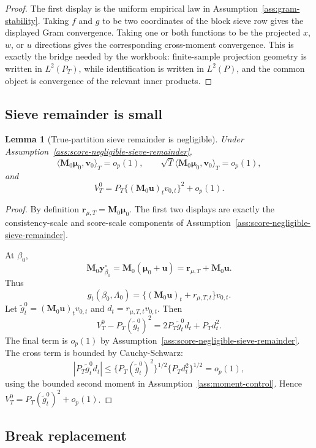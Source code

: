 \documentclass[12pt]{article}
\numberwithin{equation}{section}
\newtheorem{lemma}{Lemma}
\theoremstyle{definition}
\newcommand{\op}{o_p}
\newcommand{\innerT}[2]{\langle #1,#2\rangle_T}
\begin{document}
\begin{proof}
The first display is the uniform empirical law in
Assumption~\ref{ass:gram-stability}. Taking \(f\) and \(g\) to be two
coordinates of the block sieve row gives the displayed Gram convergence.
Taking one or both functions to be the projected \(x\), \(w\), or \(u\)
directions gives the corresponding cross-moment convergence. This is exactly
the bridge needed by the workbook: finite-sample projection geometry is written
in \(L^2(P_T)\), while identification is written in \(L^2(P)\), and the common
object is convergence of the relevant inner products.
\end{proof}
\subsection{Sieve remainder is small}

\begin{lemma}[True-partition sieve remainder is negligible]
\label{lem:part2-sieve-remainder}
Under Assumption~\ref{ass:score-negligible-sieve-remainder},
\[
    \innerT{\bm M_0\bm\mu_0}{\bm v_0}=\op(1),
    \qquad
    \sqrt T\innerT{\bm M_0\bm\mu_0}{\bm v_0}=\op(1),
\]
and
\[
    V_T^0
    =P_T\{(\bm M_0\bm u)_tv_{0,t}\}^2+\op(1).
\]
\end{lemma}

\begin{proof}
By definition \(\bm r_{\mu,T}=\bm M_0\bm\mu_0\). The first two displays are
exactly the consistency-scale and score-scale components of
Assumption~\ref{ass:score-negligible-sieve-remainder}.

At \(\beta_0\),
\[
    \bm M_0\bm y_{\beta_0}^\circ
    =\bm M_0(\bm\mu_0+\bm u)
    =\bm r_{\mu,T}+\bm M_0\bm u.
\]
Thus
\[
    g_t(\beta_0,\Lambda_0)
    =\{(\bm M_0\bm u)_t+r_{\mu,T,t}\}v_{0,t}.
\]
Let \(\tilde g_t^0=(\bm M_0\bm u)_tv_{0,t}\) and
\(d_t=r_{\mu,T,t}v_{0,t}\). Then
\[
    V_T^0-P_T(\tilde g_t^0)^2
    =2P_T\tilde g_t^0d_t+P_Td_t^2.
\]
The final term is \(\op(1)\) by Assumption~\ref{ass:score-negligible-sieve-remainder}.
The cross term is bounded by Cauchy-Schwarz:
\[
    |P_T\tilde g_t^0d_t|
    \le \{P_T(\tilde g_t^0)^2\}^{1/2}\{P_Td_t^2\}^{1/2}=\op(1),
\]
using the bounded second moment in Assumption~\ref{ass:moment-control}. Hence
\(V_T^0=P_T(\tilde g_t^0)^2+\op(1)\).
\end{proof}

\subsection{Break replacement}
\end{document}

